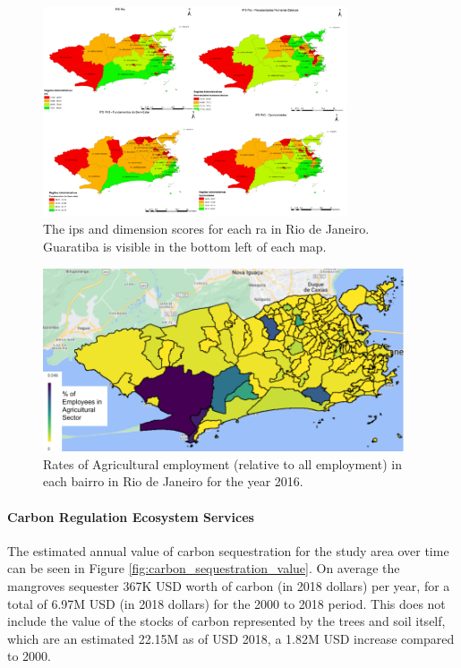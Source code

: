 \begin{figure}[H] 
\centering
\includegraphics[width=0.80\textwidth]{Figures/chap4/ips_maps.png}
\caption[Map of Social Progress Indicator for Rio de Janeiro]{The \acf{ips} and dimension scores for each \ac{ra} in Rio de Janeiro. Guaratiba is visible in the bottom left of each map.}
\label{fig:ips_maps}
\end{figure}

\begin{figure}[H] 
\centering
\includegraphics[width=0.95\textwidth]{Figures/chap4/agriculture_employment.png}
\caption[Agricultural Employment Across Rio de Janeiro]{Rates of Agricultural employment (relative to all employment) in each bairro in Rio de Janeiro for the year 2016.}
\label{fig:agriculture_employment}
\end{figure}

\paragraph{Carbon Regulation Ecosystem Services} \leavevmode\newline

The estimated annual value of carbon sequestration for the study area over time can be seen in Figure \ref{fig:carbon_sequestration_value}. On average the mangroves sequester 367K USD worth of carbon (in 2018 dollars) per year, for a total of 6.97M USD (in 2018 dollars) for the 2000 to 2018 period. This does not include the value of the stocks of carbon represented by the trees and soil itself, which are an estimated 22.15M as of USD 2018, a 1.82M USD increase compared to 2000.
    

